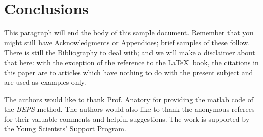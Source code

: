 \documentclass{cocseArticle}
\begin{document}
\section{Conclusions}
This paragraph will end the body of this sample document.
Remember that you might still have Acknowledgments or
Appendices; brief samples of these
follow.  There is still the Bibliography to deal with; and
we will make a disclaimer about that here: with the exception
of the reference to the \LaTeX\ book, the citations in
this paper are to articles which have nothing to
do with the present subject and are used as
examples only.


\begin{acks}
	The authors would like to thank Prof. Anatory for providing the
	matlab code of  the \textit{BEPS} method. The authors would also like to thank the anonymous referees for
	their valuable comments and helpful suggestions. The work is
	supported by the Young
		Scientsts' Support Program.
	
\end{acks}





\end{document}
